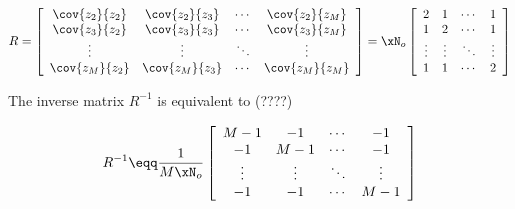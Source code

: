 \begin{theorem}
\[
   R =
   \left[
   \begin{array}{cccc}
      \cov{z_2}{z_2}  & \cov{z_2}{z_3} & \cdots & \cov{z_2}{z_M}  \\
      \cov{z_3}{z_2}  & \cov{z_3}{z_3} & \cdots & \cov{z_3}{z_M}  \\
      \vdots          & \vdots         & \ddots & \vdots          \\
      \cov{z_M}{z_2}  & \cov{z_M}{z_3} & \cdots & \cov{z_M}{z_M}
   \end{array}
   \right]
   =
   \xN_o \left[
   \begin{array}{cccc}
      2      & 1      &  \cdots &  1     \\
      1      & 2      &  \cdots &  1     \\
      \vdots & \vdots &  \ddots & \vdots \\
      1      & 1      &  \cdots &  2
   \end{array}
   \right]
\]

The inverse matrix $R^{-1}$ is equivalent to (????) \attention

\[
   R^{-1} \eqq
   \frac{1}{M\xN_o} \left[
   \begin{array}{cccc}
      M-1     & -1      &  \cdots &  -1     \\
      -1      & M-1     &  \cdots &  -1     \\
      \vdots  & \vdots  &  \ddots & \vdots  \\
      -1      & -1      &  \cdots & M-1
   \end{array}
   \right]
\]
\end{theorem}



